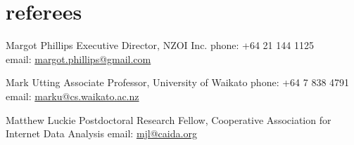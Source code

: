 \documentclass[11pt]{boris-cv}
\begin{document}
\section{referees}

  {Margot Phillips}
  {Executive Director, NZOI Inc.}
  {phone: +64 21 144 1125
  \\email: \href{mailto:margot.phillips@gmail.com}{margot.phillips@gmail.com}}

  {Mark Utting}
  {Associate Professor, University of Waikato}
  {phone: +64 7 838 4791
  \\email: \href{mailto:marku@cs.waikato.ac.nz}
  {marku@cs.waikato.ac.nz}}

  {Matthew Luckie}
  {Postdoctoral Research Fellow,
  Cooperative Association for Internet Data Analysis}
  {email: \href{mailto:mjl@caida.org}{mjl@caida.org}}
\end{document}
